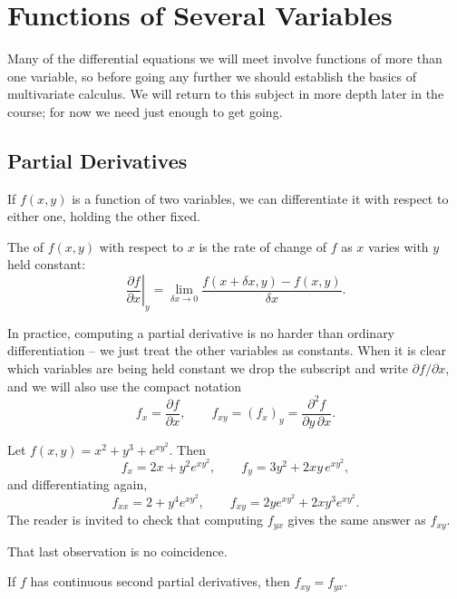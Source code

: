 \documentclass[a4paper]{scrartcl}
\begin{document}
\section{Functions of Several Variables}

Many of the differential equations we will meet involve functions of more than one variable, so before going any further we should establish the basics of multivariate calculus. We will return to this subject in more depth later in the course; for now we need just enough to get going.

\subsection{Partial Derivatives}

If $f(x, y)$ is a function of two variables, we can differentiate it with respect to either one, holding the other fixed.

\begin{definition}
	The  of $f(x, y)$ with respect to $x$ is the rate of change of $f$ as $x$ varies with $y$ held constant:
	$$
	\left.\frac{\partial f}{\partial x}\right|_y = \lim_{\delta x \to 0} \frac{f(x + \delta x, y) - f(x, y)}{\delta x}.
	$$
\end{definition}

In practice, computing a partial derivative is no harder than ordinary differentiation -- we just treat the other variables as constants. When it is clear which variables are being held constant we drop the subscript and write $\partial f/\partial x$, and we will also use the compact notation
$$
f_x = \frac{\partial f}{\partial x}, \qquad f_{xy} = (f_x)_y = \frac{\partial^2 f}{\partial y \, \partial x}.
$$

\begin{example}
	Let $f(x, y) = x^2 + y^3 + e^{x y^2}$. Then
	$$
	f_x = 2x + y^2 e^{xy^2}, \qquad f_y = 3y^2 + 2xy \, e^{xy^2},
	$$
	and differentiating again,
	$$
	f_{xx} = 2 + y^4 e^{xy^2}, \qquad f_{xy} = 2y e^{xy^2} + 2x y^3 e^{xy^2}.
	$$
	The reader is invited to check that computing $f_{yx}$ gives the same answer as $f_{xy}$.
\end{example}

That last observation is no coincidence.

\begin{theorem}
	If $f$ has continuous second partial derivatives, then $f_{xy} = f_{yx}$.
\end{theorem}
\end{document}
